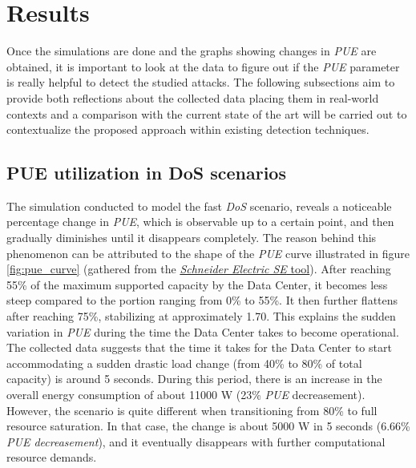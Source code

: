 \section{Results}
Once the simulations are done and the graphs showing changes in \emph{PUE} are obtained, it is important to look at the data to figure out if the \emph{PUE} parameter is really helpful to detect the studied attacks. The following subsections aim to provide both reflections about the collected data placing them in real-world contexts and a comparison with the current state of the art will be carried out to contextualize the proposed approach within existing detection techniques.

\subsection{PUE utilization in DoS scenarios}
The simulation conducted to model the fast \emph{DoS} scenario, reveals a noticeable percentage change in \emph{PUE}, which is observable up to a certain point, and then gradually diminishes until it disappears completely. The reason behind this phenomenon can be attributed to the shape of the \emph{PUE} curve illustrated in figure \ref{fig:pue_curve} (gathered from the \href{https://www.se.com/ww/en/work/solutions/system/s1/data-center-and-network-systems/trade-off-tools/data-center-efficiency-and-pue-calculator/}{\emph{Schneider Electric SE} tool}). After reaching 55\% of the maximum supported capacity by the Data Center, it becomes less steep compared to the portion ranging from 0\% to 55\%. It then further flattens after reaching 75\%, stabilizing at approximately 1.70. This explains the sudden variation in \emph{PUE} during the time the Data Center takes to become operational. The collected data suggests that the time it takes for the Data Center to start accommodating a sudden drastic load change (from 40\% to 80\% of total capacity) is around 5 seconds. During this period, there is an increase in the overall energy consumption of about 11000 W (23\% \emph{PUE} decreasement). However, the scenario is quite different when transitioning from 80\% to full resource saturation. In that case, the change is about 5000 W in 5 seconds (6.66\% \emph{PUE decreasement}), and it eventually disappears with further computational resource demands. 
